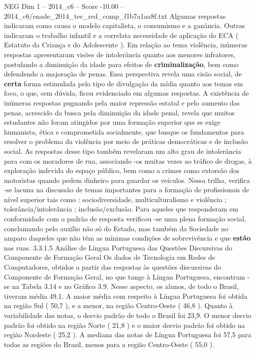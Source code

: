 \begin{textsample}{NEG Dim 1 – 2014\_c6 – Score -10.00 – 2014\_c6/enade\_2014\_tec\_red\_comp\_f1b7a1aa8f.txt}
Algumas respostas indicaram como causa o modelo capitalista, o consumismo e a ganância.
Outras indicaram o trabalho infantil e a correlata necessidade de aplicação do ECA ( Estatuto da Criança e do Adolescente ).
Em relação ao tema violência, inúmeras respostas apresentaram visões de intolerância quanto aos menores infratores, postulando a diminuição da idade para efeitos de \textbf{criminalização}, bem como defendendo a majoração de penas.
Essa perspectiva revela uma cisão social, de \textbf{certa} forma estimulada pelo tipo de divulgação da mídia quanto aos temas em foco, o que, sem dúvida, ficou evidenciado em algumas respostas.
A existência de inúmeras respostas pugnando pela maior repressão estatal e pelo aumento das penas, acrescido da busca pela diminuição da idade penal, revela que muitos estudantes não foram atingidos por uma formação superior que se exige humanista, ética e comprometida socialmente, que busque os fundamentos para resolver o problema da violência por meio de práticas democráticas e de inclusão social.
As respostas desse tipo também revelaram um alto grau de intolerância para com os moradores de rua, associando -os muitas vezes ao tráfico de drogas, à exploração indevida do espaço público, bem como a crimes como extorsão dos motoristas quando pedem dinheiro para guardar os veículos.
Nessa trilha, verifica -se lacuna na discussão de temas importantes para a formação de profissionais de nível superior tais como : sociodiversidade, multiculturalismo e violência ; tolerância/intolerância ; inclusão/exclusão.
Para aqueles que responderam em conformidade com o padrão de resposta verificou -se uma plena formação social, conclamando pelo auxílio não só do Estado, mas também da Sociedade no amparo daqueles que não têm as mínimas condições de sobrevivência e que \textbf{estão} nas ruas. 3.3.1.5 Análise de Língua Portuguesa das Questões Discursivas do Componente de Formação Geral Os dados de Tecnologia em Redes de Computadores, obtidos a partir das respostas às questões discursivas do Componente de Formação Geral, no que tange à Língua Portuguesa, encontram -se na Tabela 3.14 e no Gráfico 3.9.
Nesse aspecto, os alunos, de todo o Brasil, tiveram média 49,1.
A maior média com respeito à Língua Portuguesa foi obtida na região Sul ( 50,7 ), e a menor, na região Centro-Oeste ( 46,8 ).
Quanto à variabilidade das notas, o desvio padrão de todo o Brasil foi 23,9.
O menor desvio padrão foi obtido na região Norte ( 21,8 ) e o maior desvio padrão foi obtido na região Nordeste ( 25,2 ).
A mediana das notas de Língua Portuguesa foi 57,5 para todas as regiões do Brasil, menos para a região Centro-Oeste ( 55,0 ).

\end{textsample}
